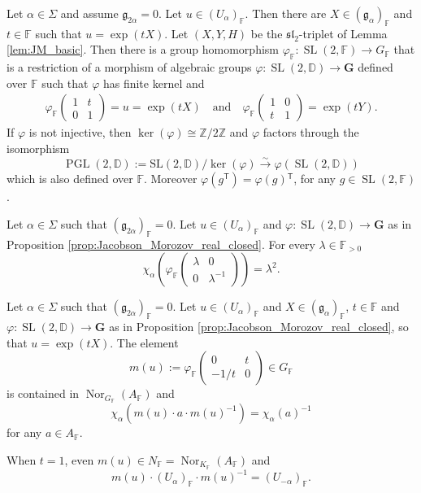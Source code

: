 \documentclass[10pt,a4paper]{amsart}
\newcommand{\D}{\mathbb{D} }
\newcommand{\F}{\mathbb{F} }
\newcommand{\Z}{\mathbb{Z} }
\newcommand{\bG}{\mathbf{G}}
\newcommand{\frakg}{\mathfrak{g}}
\newcommand{\tran}{{^{\mathsf{T}}\!}}
\begin{document}
\begin{proposition}\label{prop:Jacobson_Morozov_real_closed}
	Let $\alpha \in \Sigma$ and assume $\frakg_{2\alpha} = 0$. Let $u \in (U_{\alpha})_\F$. Then there are $ X \in (\frakg_\alpha)_\F$ and $t \in \F$ such that $u=\exp(tX)$. Let $(X,Y,H)$ be the $\mathfrak{sl}_2$-triplet of Lemma \ref{lem:JM_basic}. Then there is a group homomorphism $\varphi_\F \colon \operatorname{SL}(2,\F) \to G_\F$ that is a restriction of a morphism of algebraic groups
	$
	\varphi \colon \operatorname{SL}(2,\D)  \to \bG 
	$
	defined over $\F$ such that $\varphi$ has finite kernel and
	\begin{align*}
		\varphi_\F \begin{pmatrix}
			1 & t \\ 0& 1
		\end{pmatrix} =  u = \exp(tX)  \quad \text{and} \quad  \varphi_\F \begin{pmatrix}
		1 & 0 \\ t & 1
		\end{pmatrix} = \exp(tY).
	\end{align*}
	If $\varphi$ is not injective, then $\ker (\varphi) \cong \Z/2\Z$ and $\varphi$ factors through the isomorphism
	$$
	\operatorname{PGL}(2,\D) := \operatorname{SL(2,\D)}/\ker(\varphi)  \xrightarrow{\sim} \varphi(\operatorname{SL}(2,\D))
	$$
	which is also defined over $\F$. Moreover $\varphi(g\tran) = \varphi(g)\tran$, for any $g \in \operatorname{SL}(2,\F)$.
\end{proposition}

\begin{lemma}\label{lem:Jacobson_Morozov_oneparam}
	Let $\alpha \in \Sigma$ such that $(\frakg_{2\alpha})_\F = 0$. Let $u\in (U_\alpha)_\F$ and $\varphi \colon \operatorname{SL}(2,\D) \to \bG$ as in Proposition \ref{prop:Jacobson_Morozov_real_closed}. For every $\lambda \in \F_{>0}$
	$$
	\chi_\alpha \left(\varphi_\F \begin{pmatrix}
		\lambda & 0 \\ 0 & \lambda^{-1}
	\end{pmatrix} \right) = \lambda^2.
	$$
\end{lemma}

\begin{lemma}\label{lem:Jacobson_Morozov_m}
	Let $\alpha \in \Sigma$ such that $(\mathfrak{g}_{2\alpha})_\F = 0$. Let $u \in (U_\alpha)_\F $ and $X\in (\frakg_\alpha)_\F$, $t\in \F$ and $\varphi \colon \operatorname{SL}(2,\D) \to \bG$ as in Proposition \ref{prop:Jacobson_Morozov_real_closed}, so that $u = \exp(tX)$. The element
	$$
	m(u) := \varphi_\F \begin{pmatrix}
		0 & t \\ -1/t & 0
	\end{pmatrix} \in G_\F
	$$ 
	is contained in $\operatorname{Nor}_{G_\F}(A_\F)$ and 
	$$
	\chi_\alpha(m(u)\cdot a\cdot m(u)^{-1}) = \chi_\alpha(a)^{-1}
	$$ 
	for any $a \in A_\F$.
	
	When $t=1$, even $m(u) \in N_\F = \operatorname{Nor}_{K_\F}(A_\F)$ and 
	$$
	m(u) \cdot (U_\alpha)_\F \cdot  m(u)^{-1} = (U_{-\alpha})_\F.
	$$
\end{lemma}
\end{document}

